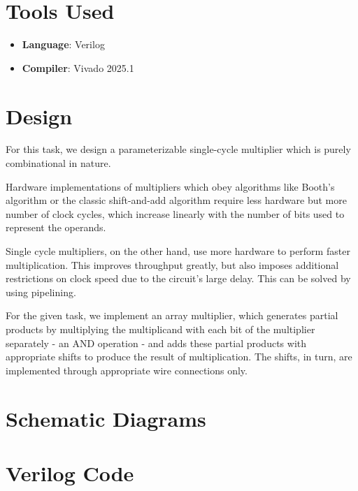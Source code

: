 \documentclass[12pt, titlepage]{report}
\begin{document}
\section{Tools Used}
\begin{itemize}
    \item \textbf{Language}: Verilog
    \item \textbf{Compiler}: Vivado 2025.1
\end{itemize}

\section{Design}

For this task, we design a parameterizable single-cycle multiplier which is purely combinational in nature.

Hardware implementations of multipliers which obey algorithms like Booth's algorithm or the classic shift-and-add algorithm require less hardware but more number of clock cycles, which increase linearly with the number of bits used to represent the operands.

Single cycle multipliers, on the other hand, use more hardware to perform faster multiplication. This improves throughput greatly, but also imposes additional restrictions on clock speed due to the circuit's large delay. This can be solved by using pipelining.

For the given task, we implement an array multiplier, which generates partial products by multiplying the multiplicand with each bit of the multiplier separately - an AND operation - and adds these partial products with appropriate shifts to produce the result of multiplication. The shifts, in turn, are implemented through appropriate wire connections only.

\section{Schematic Diagrams}





\section{Verilog Code}
\end{document}
